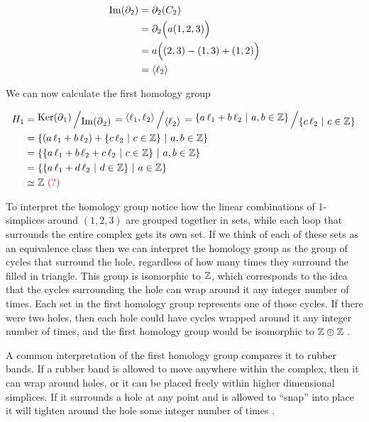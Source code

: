 \begin{example}
    \begin{align}
        \operatorname{Im} (\partial_2)   &= \partial_2 (C_2) \\
            &= \partial_2 \Big( a(1,2,3) \Big) \\
            &= a\Big((2,3) - (1,3) + (1,2) \Big)\\
            &= \langle \ell_2 \rangle
    \end{align}

    We can now calculate the first homology group

    \begin{align}
        H_1 &= \bigslant{\Ker(\boundary_1)}{\Ima(\boundary_{2})}
        = \bigslant{\langle \ell_1, \ell_2 \rangle}{\langle \ell_2 \rangle}
        = \bigslant{\{ a\,\ell_1 + b\,\ell_2\ |\ a,b \in \Z \}}{\{ c\,\ell_2\ |\ c \in \Z \}} \\
        &= \{ (a\,\ell_1 + b\,\ell_2) + \{ c\,\ell_2\ |\ c \in \Z \}\ |\ a,b \in \Z \} \\
        &= \{ \{ a\,\ell_1 + b\,\ell_2 + c\,\ell_2\ |\ c \in \Z \}\ |\ a,b \in \Z \} \\
        &= \{ \{ a\,\ell_1 + d\,\ell_2\ |\ d \in \Z \}\ |\ a \in \Z \} \\
        &\simeq \Z \text{ \red{(?)}}
    \end{align}

    To interpret the homology group notice how the linear combinations of 1-simplices around \((1,2,3)\) are grouped together in sets, while each loop that surrounds the entire complex gets its own set. If we think of each of these sets as an equivalence class then we can interpret the homology group as the group of cycles that surround the hole, regardless of how many times they surround the filled in triangle. This group is isomorphic to \(\mathbb{Z}\), which corresponds to the idea that the cycles surrounding the hole can wrap around it any integer number of times. Each set in the first homology group represents one of those cycles. If there were two holes, then each hole could have cycles wrapped around it any integer number of times, and the first homology group would be isomorphic to \(\mathbb{Z} \oplus \mathbb{Z}\) .

    A common interpretation of the first homology group compares it to rubber bands. If a rubber band is allowed to move anywhere within the complex, then it can wrap around holes, or it can be placed freely within higher dimensional simplices. If it surrounds a hole at any point and is allowed to ``snap'' into place it will tighten around the hole some integer number of times .
\end{example}

